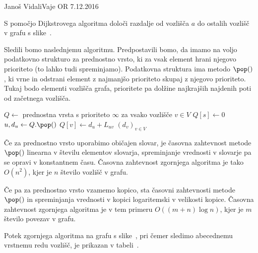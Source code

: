\begin{naloga}{Janoš Vidali}{Vaje OR 7.12.2016}
\begin{vprasanje}
S pomočjo Dijkstrovega algoritma
določi razdalje od vozlišča $a$ do ostalih vozlišč
v grafu s slike~\fig.

\begin{slika}
\pgfslika
{}
\end{slika}
\end{vprasanje}


\begin{odgovor}
Sledili bomo naslednjemu algoritmu.
Predpostavili bomo,
da imamo na voljo podatkovno strukturo za prednostno vrsto,
ki za vsak element hrani njegovo prioriteto (to lahko tudi spreminjamo).
Podatkovna struktura ima metodo $\pop()$,
ki vrne in odstrani element z najmanjšo prioriteto
skupaj z njegovo prioriteto.
Tukaj bodo elementi vozlišča grafa,
prioritete pa dolžine najkrajših najdenih poti od začetnega vozlišča.
\begin{small}
\begin{algorithmic}
	\State $Q \gets$ prednostna vrsta
        s prioriteto $\infty$ za vsako vozlišče $v \in V$
	\State $Q[s] \gets 0$
		\State $u, d_u \gets Q.\pop()$
				\State $Q[v] \gets d_u + L_{uv}$
			\EndIf
		\EndFor
	\EndWhile
    \State \Return $(d_v)_{v \in V}$
\EndFunction
\end{algorithmic}
\end{small}
Če za prednostno vrsto uporabimo običajen slovar,
je časovna zahtevnost metode $\pop()$ linearna v številu elementov slovarja,
spreminjanje vrednosti v slovarje pa se opravi v konstantnem času.
Časovna zahtevnost zgornjega algoritma je tako $O(n^2)$,
kjer je $n$ število vozlišč v grafu.

Če pa za prednostno vrsto vzamemo kopico,
sta časovni zahtevnosti metode $\pop()$ in spreminjanja vrednosti v kopici
logaritemski v velikosti kopice.
Časovna zahtevnost zgornjega algoritma je v tem primeru $O((m+n) \log n)$,
kjer je $m$ število povezav v grafu.

Potek zgornjega algoritma na grafu s slike~\fig,
pri čemer sledimo abecednemu vrstnemu redu vozlišč,
je prikazan v tabeli~\tab.


\end{odgovor}
\end{naloga}
